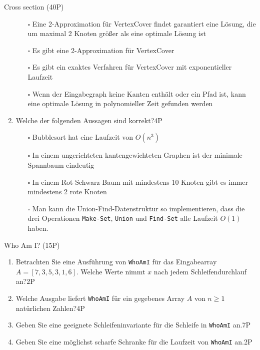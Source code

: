 \documentclass{article}
\begin{document}
\begin{exercise}{Cross section (40P)}
\begin{enumerate}
          \begin{itemize}
            \item[$\square$] Eine 2-Approximation für VertexCover findet garantiert eine Lösung, die um maximal 2 Knoten größer als eine optimale Lösung ist
            \item[$\square$] Es gibt eine 2-Approximation für VertexCover
            \item[$\square$] Es gibt ein exaktes Verfahren für VertexCover mit exponentieller Laufzeit
            \item[$\square$] Wenn der Eingabegraph keine Kanten enthält oder ein Pfad ist, kann eine optimale Lösung in polynomieller Zeit gefunden werden
          \end{itemize}
    \item Welche der folgenden Aussagen sind korrekt?\hfill 4P
          \begin{itemize}
            \item[$\square$] Bubblesort hat eine Laufzeit von $O(n^3)$
            \item[$\square$] In einem ungerichteten kantengewichteten Graphen ist der minimale Spannbaum eindeutig
            \item[$\square$] In einem Rot-Schwarz-Baum mit mindestens 10 Knoten gibt es immer mindestens 2 rote Knoten
            \item[$\square$] Man kann die Union-Find-Datenstruktur so implementieren, dass die drei Operationen \texttt{Make-Set}, \texttt{Union} und \texttt{Find-Set} alle Laufzeit $O(1)$ haben.
          \end{itemize}
  \end{enumerate}
  \begin{solution}
  \end{solution}
\end{exercise}

\begin{exercise}{Who Am I? (15P)}
  
  \begin{enumerate}
    \item Betrachten Sie eine Ausführung von \texttt{WhoAmI} für das Eingabearray $A = [7,3,5,3,1,6]$. Welche Werte nimmt $x$ nach jedem Schleifendurchlauf an?\hfill 2P
    \item Welche Ausgabe liefert \texttt{WhoAmI} für ein gegebenes Array $A$ von $n \geq 1$ natürlichen Zahlen?\hfill 4P
    \item Geben Sie eine geeignete Schleifeninvariante für die Schleife in \texttt{WhoAmI} an.\hfill 7P
    \item Geben Sie eine möglichst scharfe Schranke für die Laufzeit von \texttt{WhoAmI} an.\hfill 2P
  \end{enumerate}
  \begin{solution}
  \end{solution}
\end{exercise}
\end{document}
